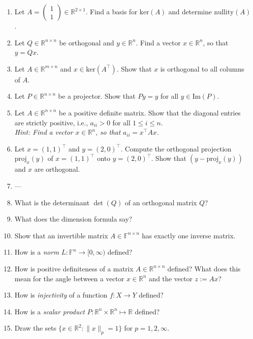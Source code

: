 \begin{enumerate}


	\item Let $A = \begin{pmatrix}1\\1\end{pmatrix} \in \mathbb{R}^{2 \times 1}$. Find a basis for $\text{ker}(A) $ and determine $\text{nullity}(A)$.
	\item Let $Q \in \mathbb{R}^{n \times n}$ be orthogonal and $y \in\mathbb{R}^{n}$. Find a vector $x \in\mathbb{R}^{n}$, so that $y = Qx$.
		\item Let $A \in \mathbb{R}^{m \times n}$ and  $x \in \text{ker}(A^\top)$. Show that $x$ is orthogonal to all columns of $A$.
		\item Let $P\in\mathbb{R}^{n\times n}$ be a projector. Show that $Py = y$ for all $y \in \text{Im}(P)$.
		\item  Let $A \in \mathbb{R}^{n \times n}$ be a positive definite matrix. Show that the diagonal entries are strictly positive, i.e.,  $a_{ii} > 0$ for all $1\leq i\leq n$.\\
		\textit{Hint: Find a vector $x\in\mathbb{R}^{n}$, so that $a_{ii}=x^\top A x$.}
		\item Let  $x=(1,1)^\top$ and $y=(2,0)^\top$. Compute the orthogonal projection $\text{proj}_x(y) $ of $x=(1,1)^\top$ onto $y=(2,0)^\top$. Show that $(y - \text{proj}_x(y))$ and $x$ are orthogonal.
		\item ---
		\item What is the determinant $\det(Q)$ of an orthogonal matrix $Q$?
	 \item What does the dimension formula say?
	 \item  Show that an invertible matrix $A\in\mathbb{F}^{n \times n}$ has exactly one inverse matrix.
	 \item How is a \textit{norm} $L: \mathbb{F}^n \to [0, \infty)$ defined?
	 \item How is positive definiteness of a matrix $A\in \mathbb{R}^{n \times n}$ defined? What does this mean for the angle
	 between a vector $x \in \mathbb{R}^{n}$ and the vector $z := Ax$?
	 \item How is \textit{injectivity} of a function $f\colon X \to Y$ defined?
	 	\item How is a \textit{scalar product} $P\colon \mathbb{R}^n \times \mathbb{R}^n \mapsto \mathbb{R}$ defined?
\item Draw the sets $\{x \in \mathbb{R}^{2} \colon \|x\|_p = 1   \}$ for $p=1,2,\infty$.

\end{enumerate}
